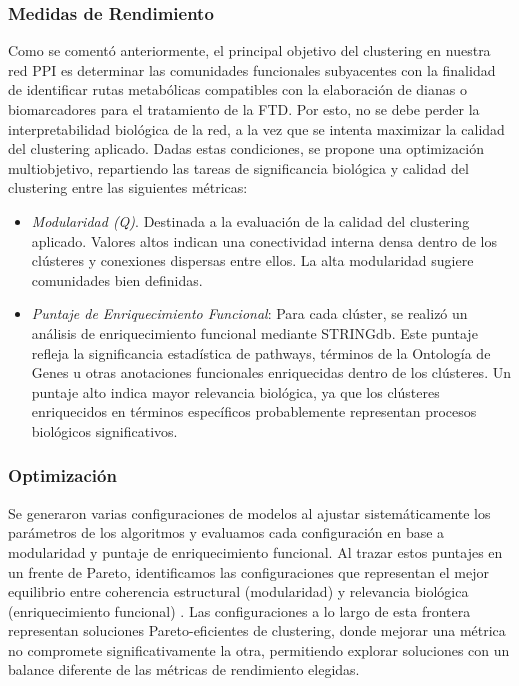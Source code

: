 \subsubsection*{Medidas de Rendimiento}

Como se comentó anteriormente, el principal objetivo del clustering en nuestra red PPI es determinar las comunidades funcionales subyacentes con la finalidad de identificar rutas metabólicas compatibles con la elaboración de dianas o biomarcadores para el tratamiento de la FTD. Por esto, no se debe perder la interpretabilidad biológica de la red, a la vez que se intenta maximizar la calidad del clustering aplicado. Dadas estas condiciones, se propone una optimización multiobjetivo, repartiendo las tareas de significancia biológica y calidad del clustering entre las siguientes métricas:

\begin{itemize}
	\item \textit{Modularidad (Q)}. Destinada a la evaluación de la calidad del clustering aplicado. Valores altos indican una conectividad interna densa dentro de los clústeres y conexiones dispersas entre ellos. La alta modularidad sugiere comunidades bien definidas.
	
	\item \textit{Puntaje de Enriquecimiento Funcional}: Para cada clúster, se realizó un análisis de enriquecimiento funcional mediante STRINGdb. Este puntaje refleja la significancia estadística de pathways, términos de la Ontología de Genes u otras anotaciones funcionales enriquecidas dentro de los clústeres. Un puntaje alto indica mayor relevancia biológica, ya que los clústeres enriquecidos en términos específicos probablemente representan procesos biológicos significativos.
\end{itemize}


\subsubsection*{Optimización}
Se generaron varias configuraciones de modelos al ajustar sistemáticamente los parámetros de los algoritmos y evaluamos cada configuración en base a modularidad y puntaje de enriquecimiento funcional. Al trazar estos puntajes en un frente de Pareto, identificamos las configuraciones que representan el mejor equilibrio entre coherencia estructural (modularidad) y relevancia biológica (enriquecimiento funcional) \cite{goodarzi2014PARETOFRONT1,jahan2013multiPARETOFRONT2,costa2015paretoPARETOFRONT3}. Las configuraciones a lo largo de esta frontera representan soluciones Pareto-eficientes de clustering, donde mejorar una métrica no compromete significativamente la otra, permitiendo explorar soluciones con un balance diferente de las métricas de rendimiento elegidas.

